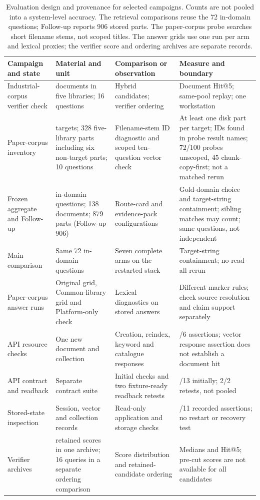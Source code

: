 \documentclass[final,5p,times,twocolumn]{elsarticle}
\begin{document}
\begin{table}[t]
\centering
\footnotesize
\setlength{\tabcolsep}{4pt}
\caption{Evaluation design and provenance for selected campaigns. Counts
are not pooled into a system-level accuracy. The retrieval comparisons
reuse the 72 in-domain questions; Follow-up reports 906 stored parts.
The paper-corpus probe searches short filename stems, not scoped titles.
The answer grids use one run per arm and lexical proxies; the verifier
score and ordering archives are separate records.}
\label{tab:eval-design}
\begin{tabular}{@{}>{\raggedright\arraybackslash}p{}>{\raggedright\arraybackslash}p{}>{\raggedright\arraybackslash}p{}>{\raggedright\arraybackslash}p{}@{}}
\toprule
Campaign and state & Material and unit & Comparison or observation & Measure and boundary\\
\midrule
Industrial-corpus verifier check & 42 documents in five libraries; 16 questions & Hybrid candidates; verifier ordering & Document Hit@5; same-pool replay; one workstation\\
Paper-corpus inventory & 100 targets; 328 five-library parts including six non-target parts; 10 questions & Filename-stem ID diagnostic and scoped ten-question vector check & At least one disk part per target; IDs found in probe result names; 72/100 probes unscoped, 45 chunk-copy-first; not a matched rerun\\
Frozen aggregate and Follow-up & 72 in-domain questions; 138 documents; 879 parts (Follow-up 906) & Route-card and evidence-pack configurations & Gold-domain choice and target-string containment; sibling matches may count; same questions, not independent\\
Main comparison & Same 72 in-domain questions & Seven complete arms on the restarted stack & Target-string containment; no read-all rerun\\
Paper-corpus answer runs & Original grid, Common-library grid and Platform-only check & Lexical diagnostics on stored answers & Different marker rules; check source resolution and claim support separately\\
API resource checks & One new document and collection & Creation, reindex, keyword and catalogue responses & 6/6 assertions; vector response assertion does not establish a document hit\\
API contract and readback & Separate contract suite & Initial checks and two fixture-ready readback retests & 11/13 initially; 2/2 retests, not pooled\\
Stored-state inspection & Session, vector and collection records & Read-only application and storage checks & 11/11 recorded assertions; no restart or recovery test\\
Verifier archives & 191 retained scores in one archive; 16 queries in a separate ordering comparison & Score distribution and retained-candidate ordering & Medians and Hit@5; pre-cut scores are not available for all candidates\\
\bottomrule
\end{tabular}
\end{table}
\end{document}
